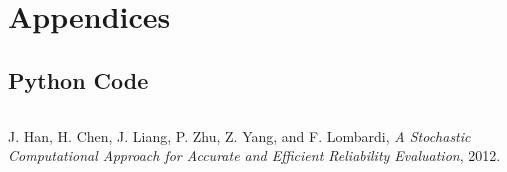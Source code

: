 \documentclass{article}
\begin{document}
\section{Appendices}
\begin{appendices}
\section{Python Code}
\label{app:code}
\inputminted[]{python}{../stochastic.py}
\end{appendices}
\begin{thebibliography}{9}

  J. Han, H. Chen, J. Liang, P. Zhu, Z. Yang, and F. Lombardi,
  \emph{A Stochastic Computational Approach for Accurate and Efficient Reliability Evaluation},
  2012.

\end{thebibliography}
\end{document}
